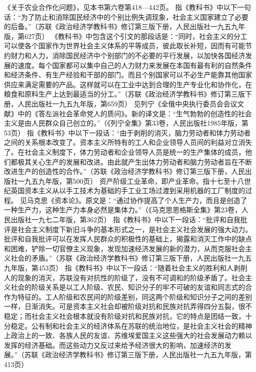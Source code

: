 \begin{maonote}
《关于农业合作化问题》，见本书第六卷第418—442页。
指《教科书》中以下一句话：“为了防止和消除国民经济中的个别比例失调现象，社会主义国家建立了必要的后备。”（苏联《政治经济学教科书》修订第三版下册，人民出版社一九五九年版，第627页）
《教科书》中包含这个引文的那段话是：“同时，社会主义的分工可以使各个国家作为世界社会主义体系的平等成员，彼此取长补短，因而有可能节约财力和人力，消除国民经济中个别部门的不必要的平行发展，以加快各国经济发展的速度。每个国家都可以集中自己的人力财力来发展在本国有最有利的自然条件和经济条件、有生产经验和干部的部门。而且个别国家可以不必生产能靠其他国家供应来满足需要的产品。这样就可以在工业中达到合理的生产专业化和协作化，在粮食和原料生产上达到最适当的分工。”（苏联《政治经济学教科书》修订第三版下册，人民出版社一九五九年版，第659页）
见列宁《全俄中央执行委员会会议文献》中的《答左派社会革命党人的质问》。新的译文是：“生气勃勃的创造性的社会主义是由人民群众自己创立的。”（《列宁全集》第33卷，人民出版社1985年版，第53页）
指《教科书》中以下一段话：“由于剥削的消灭，脑力劳动者和体力劳动者之间的关系根本改变了。资本主义所特有的工人和企业领导人员间的利益对立消失了。在社会主义制度下，体力劳动者和企业领导人员是统一的生产集体的成员，他们都极其关心生产的发展和改进。由此就产生出体力劳动者和脑力劳动者旨在不断改进生产的创造性的合作。”（苏联《政治经济学教科书》修订第三版下册，人民出版社一九五九年版，第500页）
资产阶级工业革命，即产业革命。指十七至十八世纪英国资本主义从以手工技术为基础的手工业工场过渡到采用机器的工厂制度的过程。
见马克思《资本论》。原文是：“通过协作提高了个人生产力，而且是创造了一种生产力，这种生产力本身必然是集体力。”（《马克思恩格斯全集》第23卷，人民出版社一九七二年版，第362页）
指《教科书》中以下一段话：“批评和自我批评是社会主义制度下新旧斗争的基本形式之一，是社会主义社会发展的强大动力。批评和自我批评可以在发挥人民群众的积极性的基础上，揭露和消灭工作中的缺点和困难，铲除一切官僚主义现象，发现加速经济发展的新的潜力，从而克服社会主义社会的矛盾。”（苏联《政治经济学教科书》修订第三版下册，人民出版社一九五九年版，第453页）
指《教科书》中以下一段话：“随着社会主义的胜利和人剥削人的现象的消灭，苏联没有对抗性的阶级了，没有不可调和的阶级矛盾了。社会主义社会的阶级关系是以工人阶级、农民、知识分子的牢不可破的友谊和同志式的合作为特征的。工人阶级和农民间的阶级差别，同这两个阶级和知识分子之间的差别一样，日渐消失。可是资本主义社会却被阶级对抗和民族对抗弄得四分五裂，很不稳定；而社会主义社会根本就没有阶级对抗和民族对抗，它的特点是团结一致，十分稳定。公有制和社会主义的经济体系在苏联的统治地位，是社会主义社会的精神上政治上的一致、各族人民的友谊、苏维埃爱国主义这些强大的社会发展动力赖以发挥的经济基础。而这些动力又反过来给予经济很大的影响，加速经济的发展。”（苏联《政治经济学教科书》修订第三版下册，人民出版社一九五九年版，第413页）

\end{maonote}
